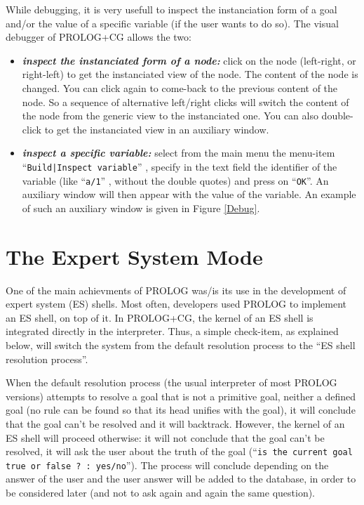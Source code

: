 \documentclass{book}
\begin{document}
While debugging, it is very usefull to inspect the instanciation
form of a goal and/or the value of a specific variable (if the user
wants to do so). The visual debugger of PROLOG+CG allows the two:

\begin{itemize}

\item {\it {\bf inspect the instanciated form of a node:}} click on
the node (left-right, or right-left) to get the instanciated view of
the node. The content of the node is changed. You can click again to
come-back to the previous content of the node. So a sequence of
alternative left/right clicks will switch the content of the node from
the generic view to the instanciated one. You can also double-click to
get the instanciated view in an auxiliary window.

\item {\bf {\it inspect a specific variable:}} select from the main
menu the menu-item ``\texttt{Build|Inspect variable}'' , specify in
the text field the identifier of the variable (like ``\texttt{a/1}'' ,
without the double quotes) and press on ``\texttt{OK}''. An auxiliary
window will then appear with the value of the variable. An example of
such an auxiliary window is given in Figure \ref{Debug}.

\end{itemize}

\section{The Expert System Mode}\label{Sec:ES}

One of the main achievments of PROLOG was/is its use in the
development of expert system (ES) shells.  Most often, developers used
PROLOG to implement an ES shell, on top of it. In PROLOG+CG, the
kernel of an ES shell is integrated directly in the interpreter. Thus,
a simple check-item, as explained below, will switch the system from
the default resolution process to the ``ES shell resolution process''.

When the default resolution process (the usual interpreter of most
PROLOG versions) attempts to resolve a goal that is not a primitive
goal, neither a defined goal (no rule can be found so that its head
unifies with the goal), it will conclude that the goal can't be
resolved and it will backtrack.  However, the kernel of an ES shell
will proceed otherwise: it will not conclude that the goal can't be
resolved, it will ask the user about the truth of the goal
(``\texttt{is the current goal true or false ? : yes/no}''). The
process will conclude depending on the answer of the user and the user
answer will be added to the database, in order to be considered later
(and not to ask again and again the same question).
\end{document}
